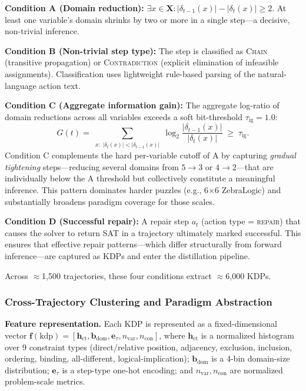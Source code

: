 \textbf{Condition A (Domain reduction):} $\exists x \in \mathbf{X}: |\delta_{t-1}(x)| - |\delta_t(x)| \geq 2$. At least one variable's domain shrinks by two or more in a single step—a decisive, non-trivial inference.

\textbf{Condition B (Non-trivial step type):} The step is classified as \textsc{Chain} (transitive propagation) or \textsc{Contradiction} (explicit elimination of infeasible assignments). Classification uses lightweight rule-based parsing of the natural-language action text.

\textbf{Condition C (Aggregate information gain):} The aggregate log-ratio of domain reductions across all variables exceeds a soft bit-threshold $\tau_{\text{ig}} = 1.0$:
\[
G(t) = \sum_{\substack{x:\; |\delta_t(x)| < |\delta_{t-1}(x)|}} \log_2 \frac{|\delta_{t-1}(x)|}{|\delta_t(x)|} \;\geq\; \tau_{\text{ig}}.
\]
Condition C complements the hard per-variable cutoff of A by capturing \textit{gradual tightening} steps—reducing several domains from $5\!\to\!3$ or $4\!\to\!2$—that are individually below the A threshold but collectively constitute a meaningful inference. This pattern dominates harder puzzles (e.g., 6$\times$6 ZebraLogic) and substantially broadens paradigm coverage for those scales.

\textbf{Condition D (Successful repair):} A repair step $a_t$ (action type = \textsc{repair}) that causes the solver to return SAT in a trajectory ultimately marked successful. This ensures that effective repair patterns—which differ structurally from forward inference—are captured as KDPs and enter the distillation pipeline.

Across $\approx$1,500 trajectories, these four conditions extract $\approx$6,000 KDPs.

\subsubsection{Cross-Trajectory Clustering and Paradigm Abstraction}

\textbf{Feature representation.} Each KDP is represented as a fixed-dimensional vector $\mathbf{f}(\text{kdp}) = [\mathbf{h}_{\text{ct}}, \mathbf{b}_{\text{dom}}, \mathbf{e}_\tau, n_{\text{var}}, n_{\text{con}}]$, where $\mathbf{h}_{\text{ct}}$ is a normalized histogram over 9 constraint types (direct/relative position, adjacency, exclusion, inclusion, ordering, binding, all-different, logical-implication); $\mathbf{b}_{\text{dom}}$ is a 4-bin domain-size distribution; $\mathbf{e}_\tau$ is a step-type one-hot encoding; and $n_{\text{var}}, n_{\text{con}}$ are normalized problem-scale metrics.

